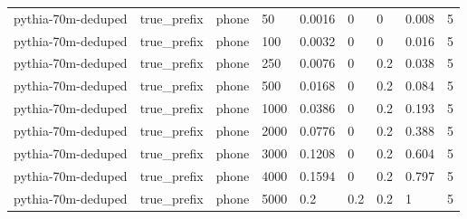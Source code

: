 \begin{tabular}{lllllllll}
pythia-70m-deduped & true\_prefix & phone & 50 & 0.0016 & 0 & 0 & 0.008 & 5 \\
pythia-70m-deduped & true\_prefix & phone & 100 & 0.0032 & 0 & 0 & 0.016 & 5 \\
pythia-70m-deduped & true\_prefix & phone & 250 & 0.0076 & 0 & 0.2 & 0.038 & 5 \\
pythia-70m-deduped & true\_prefix & phone & 500 & 0.0168 & 0 & 0.2 & 0.084 & 5 \\
pythia-70m-deduped & true\_prefix & phone & 1000 & 0.0386 & 0 & 0.2 & 0.193 & 5 \\
pythia-70m-deduped & true\_prefix & phone & 2000 & 0.0776 & 0 & 0.2 & 0.388 & 5 \\
pythia-70m-deduped & true\_prefix & phone & 3000 & 0.1208 & 0 & 0.2 & 0.604 & 5 \\
pythia-70m-deduped & true\_prefix & phone & 4000 & 0.1594 & 0 & 0.2 & 0.797 & 5 \\
pythia-70m-deduped & true\_prefix & phone & 5000 & 0.2 & 0.2 & 0.2 & 1 & 5 \\
\bottomrule
\end{tabular}
